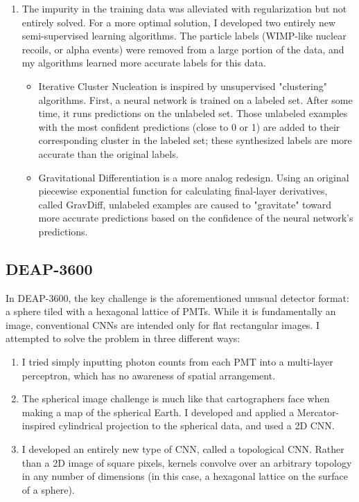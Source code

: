 \documentclass[12pt]{article}
\begin{document}
\begin{enumerate}
\begin{figure}[ht]
    \end{figure}
    \item The impurity in the training data was alleviated with regularization but not entirely solved. For a more optimal solution, I developed two entirely new semi-supervised learning algorithms. The particle labels (WIMP-like nuclear recoils, or alpha events) were removed from a large portion of the data, and my algorithms learned more accurate labels for this data.
    \begin{itemize}
        \item Iterative Cluster Nucleation is inspired by unsupervised "clustering" algorithms. First, a neural network is trained on a labeled set. After some time, it runs predictions on the unlabeled set. Those unlabeled examples with the most confident predictions (close to 0 or 1) are added to their corresponding cluster in the labeled set; these synthesized labels are more accurate than the original labels.
        \item Gravitational Differentiation is a more analog redesign. Using an original piecewise exponential function for calculating final-layer derivatives, called GravDiff, unlabeled examples are caused to "gravitate" toward more accurate predictions based on the confidence of the neural network's predictions.
    \end{itemize}
\end{enumerate}

\subsection{DEAP-3600}

In DEAP-3600, the key challenge is the aforementioned unusual detector format: a sphere tiled with a hexagonal lattice of PMTs. While it is fundamentally an image, conventional CNNs are intended only for flat rectangular images. I attempted to solve the problem in three different ways:

\begin{enumerate}
    \item I tried simply inputting photon counts from each PMT into a multi-layer perceptron, which has no awareness of spatial arrangement.
    \item The spherical image challenge is much like that cartographers face when making a map of the spherical Earth. I developed and applied a Mercator-inspired cylindrical projection to the spherical data, and used a 2D CNN.
    \item I developed an entirely new type of CNN, called a topological CNN. Rather than a 2D image of square pixels, kernels convolve over an arbitrary topology in any number of dimensions (in this case, a hexagonal lattice on the surface of a sphere).
\end{enumerate}
\end{document}
